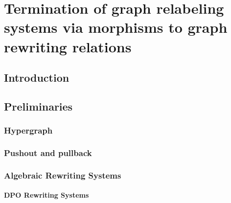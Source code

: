 \documentclass{book}
\begin{document}
\part{Termination of graph relabeling systems via morphisms to graph rewriting relations}

\chapter{Introduction}


\chapter{Preliminaries} 
    \label{sec:grs}

    \section{Hypergraph}
        \label{sec:hypergraph}
        
    
    \section{Pushout and pullback}
        \label{sec:category_theory}
        

    \section{Algebraic Rewriting Systems} 
    \subsection{DPO Rewriting Systems}
\end{document}
